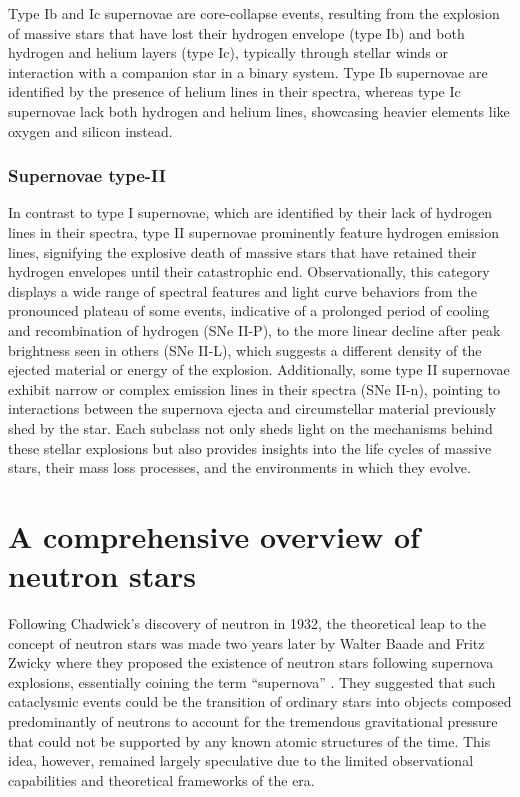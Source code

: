 \documentclass[main.tex]{subfiles}
\begin{document}
    Type Ib and Ic supernovae are core-collapse events, resulting from the explosion of massive stars that have lost their hydrogen envelope (type Ib) and both hydrogen and helium layers (type Ic), typically through stellar winds or interaction with a companion star in a binary system. Type Ib supernovae are identified by the presence of helium lines in their spectra, whereas type Ic supernovae lack both hydrogen and helium lines, showcasing heavier elements like oxygen and silicon instead.
    
    \subsubsection{Supernovae type-II}
    In contrast to type I supernovae, which are identified by their lack of hydrogen lines in their spectra, type II supernovae prominently feature hydrogen emission lines, signifying the explosive death of massive stars that have retained their hydrogen envelopes until their catastrophic end. Observationally, this category displays a wide range of spectral features and light curve behaviors from the pronounced plateau of some events, indicative of a prolonged period of cooling and recombination of hydrogen (SNe II-P), to the more linear decline after peak brightness seen in others (SNe II-L), which suggests a different density of the ejected material or energy of the explosion. Additionally, some type II supernovae exhibit narrow or complex emission lines in their spectra (SNe II-n), pointing to interactions between the supernova ejecta and circumstellar material previously shed by the star.  Each subclass not only sheds light on the mechanisms behind these stellar explosions but also provides insights into the life cycles of massive stars, their mass loss processes, and the environments in which they evolve.


    \section{A comprehensive overview of neutron stars}\label{sec:ch1:ns_struct}
    Following Chadwick's discovery of neutron in 1932, the theoretical leap to the concept of neutron stars was made two years later by Walter Baade and Fritz Zwicky where they proposed the existence of neutron stars following supernova explosions, essentially coining the term ``supernova'' \citep{PhysRev.46.76.2, 1934PNAS...20..259B, 1934PNAS...20..254B}. They suggested that such cataclysmic events could be the transition of ordinary stars into objects composed predominantly of neutrons to account for the tremendous gravitational pressure that could not be supported by any known atomic structures of the time. This idea, however, remained largely speculative due to the limited observational capabilities and theoretical frameworks of the era.
    
\end{document}
